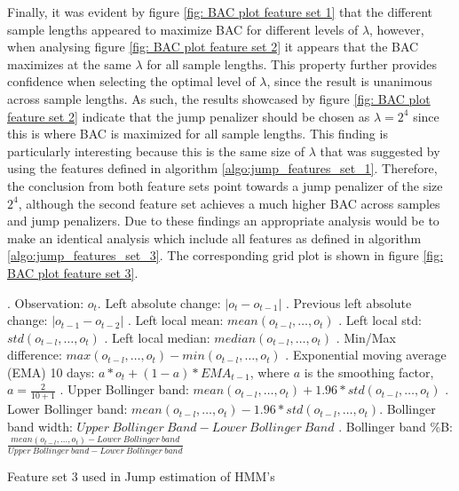 Finally, it was evident by figure \ref{fig: BAC plot feature set 1} that the different sample lengths appeared to maximize BAC for different levels of $\lambda$, however, when analysing figure \ref{fig: BAC plot feature set 2} it appears that the BAC maximizes at the same $\lambda$ for all sample lengths. This property further provides confidence when selecting the optimal level of $\lambda$, since the result is unanimous across sample lengths. As such, the results showcased by figure \ref{fig: BAC plot feature set 2} indicate that the jump penalizer should be chosen as $\lambda = 2^4$ since this is where BAC is maximized for all sample lengths. This finding is particularly interesting because this is the same size of $\lambda$ that was suggested by using the features defined in algorithm \ref{algo:jump_features_set_1}. Therefore, the conclusion from both feature sets point towards a jump penalizer of the size $2^4$, although the second feature set achieves a much higher BAC across samples and jump penalizers. Due to these findings an appropriate analysis would be to make an identical analysis which include all features as defined in algorithm \ref{algo:jump_features_set_3}. The corresponding grid plot is shown in figure \ref{fig: BAC plot feature set 3}.

\begin{algorithm}[H]
. Observation: $o_t$. Left absolute change: $|o_t-o_{t-1}|$ . Previous left absolute change: $|o_{t-1}-o_{t-2}|$ . Left local mean: $mean(o_{t-l},\ldots,o_{t})$ . Left local std: $std(o_{t-l},\ldots, o_{t})$ . Left local median: $median(o_{t-l},\ldots,o_{t})$ . Min/Max difference: $max(o_{t-l},\ldots,o_{t}) - min(o_{t-l},\ldots,o_{t})$ . Exponential moving average (EMA) 10 days: $a * o_t + (1-a) * EMA_{t-1}$, \quad where $a$ is the smoothing factor, $a = \frac{2}{10+1}$ . Upper Bollinger band: $mean(o_{t-l},\ldots,o_t) + 1.96 * std(o_{t-l},\ldots,o_t)$ . Lower Bollinger band: $mean(o_{t-l},\ldots,o_t) - 1.96 * std(o_{t-l},\ldots,o_t)$. Bollinger band width: $Upper\ Bollinger\ Band - Lower\  Bollinger\ Band$ . Bollinger band \%B: $\frac{mean(o_{t-l},\ldots,o_{t}) - Lower\ Bollinger\ band} {Upper\ Bollinger\ band - Lower\ Bollinger\ band}$  \;
\BlankLine
{}
\caption{Feature set 3 used in Jump estimation of HMM's}
\label{algo:jump_features_set_3}
\end{algorithm}


